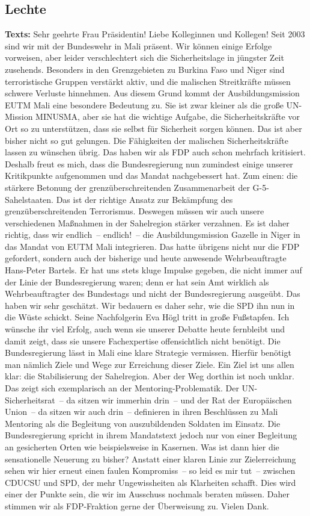 \documentclass{article}
\begin{document}
\subsection{Lechte}
\noindent\textbf{Texts:} Sehr geehrte Frau Präsidentin! Liebe Kolleginnen und Kollegen! Seit 2003 sind wir mit der Bundeswehr in Mali präsent. Wir können einige Erfolge vorweisen, aber leider verschlechtert sich die Sicherheitslage in jüngster Zeit zusehends. Besonders in den Grenzgebieten zu Burkina Faso und Niger sind terroristische Gruppen verstärkt aktiv, und die malischen Streitkräfte müssen schwere Verluste hinnehmen. Aus diesem Grund kommt der Ausbildungsmission EUTM Mali eine besondere Bedeutung zu. Sie ist zwar kleiner als die große UN-Mission MINUSMA, aber sie hat die wichtige Aufgabe, die Sicherheitskräfte vor Ort so zu unterstützen, dass sie selbst für Sicherheit sorgen können. Das ist aber bisher nicht so gut gelungen. Die Fähigkeiten der malischen Sicherheitskräfte lassen zu wünschen übrig. Das haben wir als FDP auch schon mehrfach kritisiert. Deshalb freut es mich, dass die Bundesregierung nun zumindest einige unserer Kritikpunkte aufgenommen und das Mandat nachgebessert hat. Zum einen: die stärkere Betonung der grenzüberschreitenden Zusammenarbeit der G-5-Sahelstaaten. Das ist der richtige Ansatz zur Bekämpfung des grenzüberschreitenden Terrorismus. Deswegen müssen wir auch unsere verschiedenen Maßnahmen in der Sahelregion stärker verzahnen. Es ist daher richtig, dass wir endlich – endlich! – die Ausbildungsmission Gazelle in Niger in das Mandat von EUTM Mali integrieren.  Das hatte übrigens nicht nur die FDP gefordert, sondern auch der bisherige und heute anwesende Wehrbeauftragte Hans-Peter Bartels.  Er hat uns stets kluge Impulse gegeben, die nicht immer auf der Linie der Bundesregierung waren; denn er hat sein Amt wirklich als Wehrbeauftragter des Bundestags und nicht der Bundesregierung ausgeübt.  Das haben wir sehr geschätzt. Wir bedauern es daher sehr, wie die SPD ihn nun in die Wüste schickt. Seine Nachfolgerin Eva Högl tritt in große Fußstapfen. Ich wünsche ihr viel Erfolg, auch wenn sie unserer Debatte heute fernbleibt und damit zeigt, dass sie unsere Fachexpertise offensichtlich nicht benötigt.  Die Bundesregierung lässt in Mali eine klare Strategie vermissen. Hierfür benötigt man nämlich Ziele und Wege zur Erreichung dieser Ziele. Ein Ziel ist uns allen klar: die Stabilisierung der Sahelregion. Aber der Weg dorthin ist noch unklar. Das zeigt sich exemplarisch an der Mentoring-Problematik. Der UN-Sicherheitsrat – da sitzen wir immerhin drin – und der Rat der Europäischen Union – da sitzen wir auch drin – definieren in ihren Beschlüssen zu Mali Mentoring als die Begleitung von auszubildenden Soldaten im Einsatz. Die Bundesregierung spricht in ihrem Mandatstext jedoch nur von einer Begleitung an gesicherten Orten wie beispielsweise in Kasernen. Was ist dann hier die sensationelle Neuerung zu bisher? Anstatt einer klaren Linie zur Zielerreichung sehen wir hier erneut einen faulen Kompromiss – so leid es mir tut – zwischen CDU\/CSU und SPD, der mehr Ungewissheiten als Klarheiten schafft. Dies wird einer der Punkte sein, die wir im Ausschuss nochmals beraten müssen. Daher stimmen wir als FDP-Fraktion gerne der Überweisung zu. Vielen Dank.  
\end{document}
